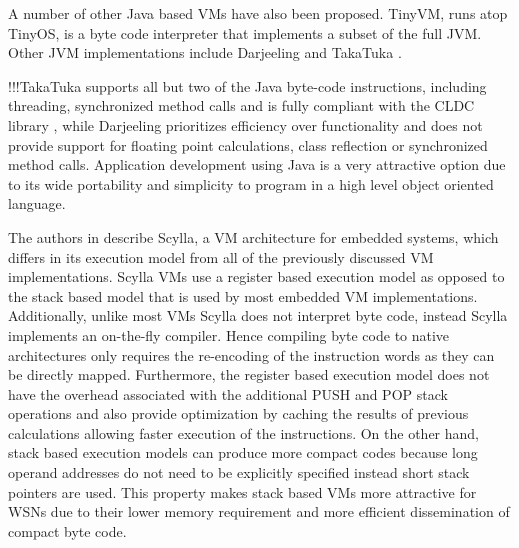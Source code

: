 A number of other Java based VMs have also been proposed. TinyVM, \cite{hong2009tinyvm} runs atop TinyOS, is a byte code interpreter that implements a subset of the full JVM. Other JVM implementations include Darjeeling \cite{Brouwers:2009:DFV:1644038.1644056}  and TakaTuka \cite{Aslam:2008:ITJ:1460412.1460472}.  

!!!TakaTuka \cite{Aslam:2008:ITJ:1460412.1460472} supports all but two of the Java byte-code instructions, including threading, synchronized method calls and is fully compliant with the CLDC library \cite{debbabi2006security}, while Darjeeling prioritizes efficiency over functionality and does not provide support for floating point calculations, class reflection or synchronized method calls. 
Application development using Java is a very attractive option due to its wide portability and simplicity to program in a high level object oriented language.

The authors in \cite{895380} describe Scylla, a VM architecture for embedded systems, which differs in its execution model from all of the previously discussed VM implementations. Scylla VMs use a register based execution model as opposed to the stack based model that is used by most embedded VM implementations. Additionally, unlike most VMs Scylla does not interpret byte code, instead Scylla implements an on-the-fly compiler. Hence compiling byte code to native architectures only requires the re-encoding of the instruction words as they can be directly mapped. Furthermore, the register based execution model does not have the overhead associated with the additional PUSH and POP stack operations and also provide optimization by caching the results of previous calculations allowing faster execution of the instructions. On the other hand, stack based execution models can produce more compact codes because long operand addresses do not need to be explicitly specified instead short stack pointers are used. This property makes stack based VMs more attractive for WSNs due to their lower memory requirement and more efficient dissemination of compact byte code. 